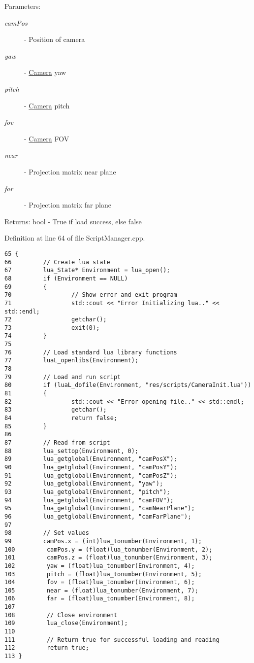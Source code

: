 \begin{Desc}
\item[Parameters:]
\begin{description}
\item[{\em camPos}]- Position of camera \item[{\em yaw}]- \hyperlink{class_camera}{Camera} yaw \item[{\em pitch}]- \hyperlink{class_camera}{Camera} pitch \item[{\em fov}]- \hyperlink{class_camera}{Camera} FOV \item[{\em near}]- Projection matrix near plane \item[{\em far}]- Projection matrix far plane\end{description}
\end{Desc}
\begin{Desc}
\item[Returns:]bool - True if load success, else false \end{Desc}


Definition at line 64 of file ScriptManager.cpp.

\begin{Code}\begin{verbatim}65 {
66         // Create lua state
67         lua_State* Environment = lua_open();
68         if (Environment == NULL)
69         {
70                 // Show error and exit program
71                 std::cout << "Error Initializing lua.." << std::endl;
72                 getchar();
73                 exit(0);
74         }
75 
76         // Load standard lua library functions
77         luaL_openlibs(Environment);
78 
79         // Load and run script
80         if (luaL_dofile(Environment, "res/scripts/CameraInit.lua"))
81         {
82                 std::cout << "Error opening file.." << std::endl;
83                 getchar();
84                 return false;
85         }
86 
87         // Read from script
88         lua_settop(Environment, 0);
89         lua_getglobal(Environment, "camPosX");
90         lua_getglobal(Environment, "camPosY");
91         lua_getglobal(Environment, "camPosZ");
92         lua_getglobal(Environment, "yaw");
93         lua_getglobal(Environment, "pitch");
94         lua_getglobal(Environment, "camFOV");
95         lua_getglobal(Environment, "camNearPlane");
96         lua_getglobal(Environment, "camFarPlane");
97 
98         // Set values
99         camPos.x = (int)lua_tonumber(Environment, 1);
100         camPos.y = (float)lua_tonumber(Environment, 2);
101         camPos.z = (float)lua_tonumber(Environment, 3);
102         yaw = (float)lua_tonumber(Environment, 4);
103         pitch = (float)lua_tonumber(Environment, 5);
104         fov = (float)lua_tonumber(Environment, 6);
105         near = (float)lua_tonumber(Environment, 7);
106         far = (float)lua_tonumber(Environment, 8);
107 
108         // Close environment
109         lua_close(Environment);
110 
111         // Return true for successful loading and reading
112         return true;
113 }
\end{verbatim}
\end{Code}


